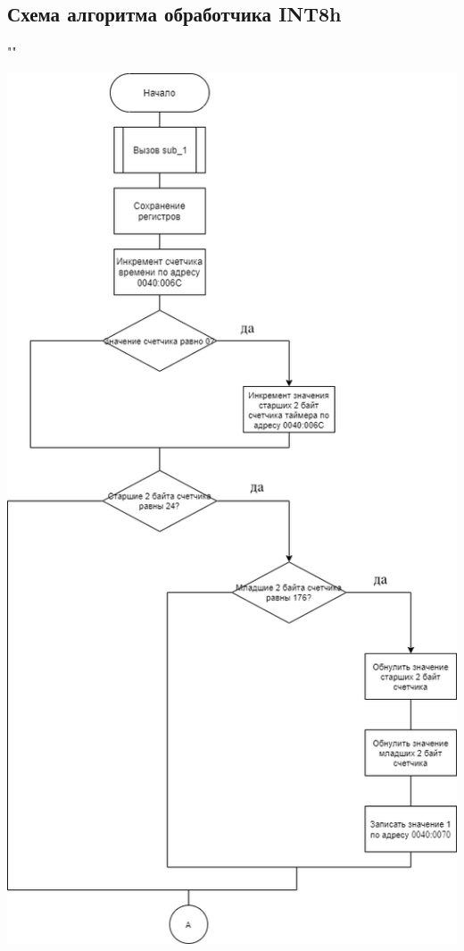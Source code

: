 \documentclass[a4paper,12pt]{article}
\begin{document}
\subsection{Схема алгоритма обработчика INT8h}
""\newline

\begin{flushright}
	\includegraphics[scale=0.5]{scheme1.png}

\end{flushright}
\end{document}
